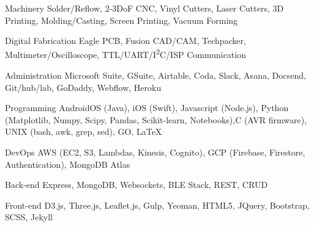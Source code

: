 

\begin{cvskills}

  \cvskill
    {Machinery} %
    {Solder/Reflow, 2-3DoF CNC, Vinyl Cutters, Laser Cutters, 3D Printing, Molding/Casting, Screen Printing, Vacuum Forming} %

  \cvskill
    {Digital Fabrication} %
    {Eagle PCB, Fusion CAD/CAM, Techpacker, Multimeter/Oscilloscope, TTL/UART/I\textsuperscript{2}C/ISP Communication} %

  \cvskill
    {Administration} %
    {Microsoft Suite, GSuite, Airtable, Coda, Slack, Asana, Docsend, Git/hub/lab, GoDaddy, Webflow, Heroku} %

  \cvskill
    {Programming} %
    {AndroidOS (Java), iOS (Swift), Javascript (Node.js), Python (Matplotlib, Numpy, Scipy, Pandas, Scikit-learn, Notebooks),\newline C (AVR firmware), UNIX (bash, awk, grep, sed), GO, LaTeX} %

  \cvskill
    {DevOps} %
    {AWS (EC2, S3, Lambdas, Kinesis, Cognito), GCP (Firebase, Firestore, Authentication), MongoDB Atlas} %

  \cvskill
    {Back-end} %
    {Express, MongoDB, Websockets, BLE Stack, REST, CRUD} %

  \cvskill
    {Front-end} %
    {D3.js, Three.js, Leaflet.js, Gulp, Yeoman, HTML5, JQuery, Bootstrap, SCSS, Jekyll} %

\end{cvskills}
